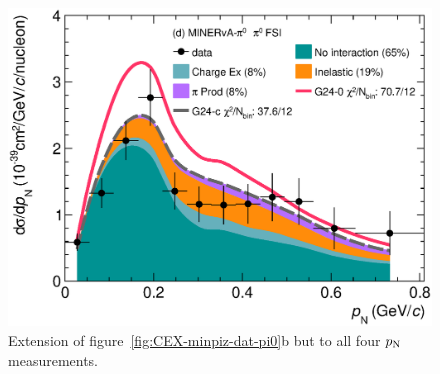 \begin{figure}[!htb]
    \includegraphics[width=\dbfigwid\textwidth]{figures/tuning/0026-min_pi0_pn_pi0_decomp_covfix.eps}
    \caption{\label{fig:g24-c-pn-pi0} Extension of figure~\ref{fig:CEX-minpiz-dat-pi0}b but to all four $p_\textrm{N}$ measurements.} 
\end{figure}

